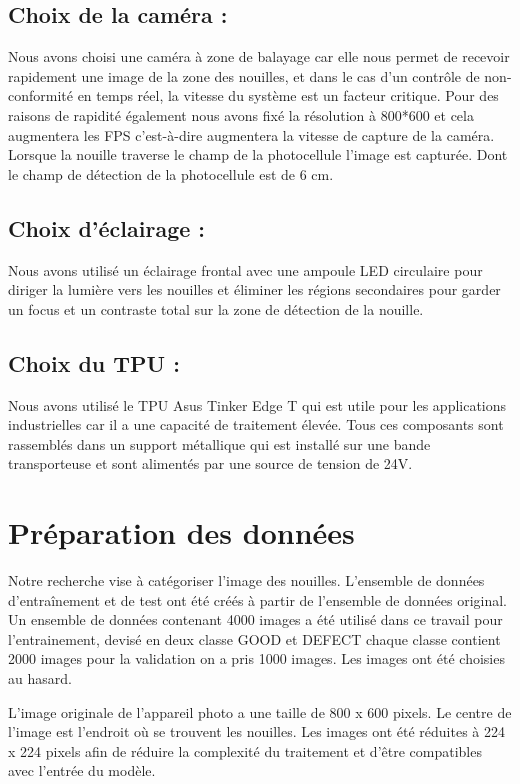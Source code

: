 \subsection{Choix de la caméra : }
Nous avons choisi une caméra à zone de balayage car elle nous permet de recevoir rapidement une image de la zone des nouilles, et dans le cas d'un contrôle de non-conformité en temps réel, la vitesse du système est un facteur critique. Pour des raisons de rapidité également nous avons fixé la résolution à 800*600 et cela augmentera les FPS c'est-à-dire augmentera la vitesse de capture de la caméra. Lorsque la nouille traverse le champ de la photocellule l'image est capturée. Dont le champ de détection de la photocellule est de 6 cm. 
\subsection{Choix d'éclairage : }
Nous avons utilisé un éclairage frontal avec une ampoule LED circulaire pour diriger la lumière vers les nouilles et éliminer les régions secondaires pour garder un focus et un contraste total sur la zone de détection de la nouille. 
\subsection{Choix du TPU : }
Nous avons utilisé le TPU Asus Tinker Edge T qui est utile pour les applications industrielles car il a une capacité de traitement élevée. Tous ces composants sont rassemblés dans un support métallique qui est installé sur une bande transporteuse et sont alimentés par une source de tension de 24V.  

\section{Préparation des données }
Notre recherche vise à catégoriser l'image des nouilles. L'ensemble de données d'entraînement et de test ont été créés à partir de l'ensemble de données original. Un ensemble de données contenant 4000 images a été utilisé dans ce travail pour l'entrainement, devisé en deux classe GOOD et DEFECT chaque classe contient 2000 images pour la validation on a pris 1000 images. Les images ont été choisies au hasard.  

L'image originale de l'appareil photo a une taille de 800 x 600 pixels. Le centre de l'image est l'endroit où se trouvent les nouilles. Les images ont été réduites à 224 x 224 pixels afin de réduire la complexité du traitement et d'être compatibles avec l'entrée du modèle. 

